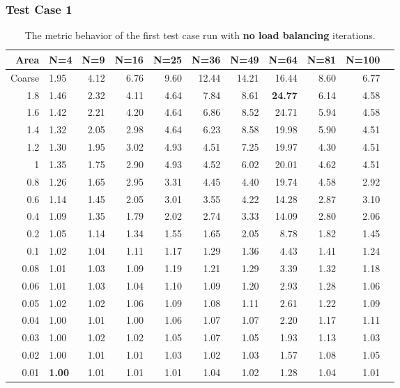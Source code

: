 \documentclass[compress]{beamer}
\begin{document}
\begin{frame}[t]\frametitle{Test Case 1}
\begin{table}[H]
\tiny
\centering
\caption{The metric behavior of the first test case run with \textbf{no load balancing} iterations.}
\begin{tabular}{rlrrrrrrrrr}
  \hline
 Area & N=4 & N=9 & N=16 & N=25 & N=36 & N=49 & N=64 & N=81 & N=100 \\ 
  \hline
 Coarse & 1.95 & 4.12 & 6.76 & 9.60 & 12.44 & 14.21 & 16.44 & 8.60 & 6.77 \\ 
   1.8 & 1.46 & 2.32 & 4.11 & 4.64 & 7.84 & 8.61 & \textbf{\cellcolor{blue!25}24.77} & 6.14 & 4.58 \\ 
 1.6 & 1.42 & 2.21 & 4.20 & 4.64 & 6.86 & 8.52 & 24.71 & 5.94 & 4.58 \\ 
 1.4 & 1.32 & 2.05 & 2.98 & 4.64 & 6.23 & 8.58 & 19.98 & 5.90 & 4.51 \\ 
 1.2 & 1.30 & 1.95 & 3.02 & 4.93 & 4.51 & 7.25 & 19.97 & 4.30 & 4.51 \\ 
  1 & 1.35 & 1.75 & 2.90 & 4.93 & 4.52 & 6.02 & 20.01 & 4.62 & 4.51 \\ 
  0.8 & 1.26 & 1.65 & 2.95 & 3.31 & 4.45 & 4.40 & 19.74 & 4.58 & 2.92 \\ 
   0.6 & 1.14 & 1.45 & 2.05 & 3.01 & 3.55 & 4.22 & 14.28 & 2.87 & 3.10 \\ 
 0.4 & 1.09 & 1.35 & 1.79 & 2.02 & 2.74 & 3.33 & 14.09 & 2.80 & 2.06 \\ 
   0.2 & 1.05 & 1.14 & 1.34 & 1.55 & 1.65 & 2.05 & 8.78 & 1.82 & 1.45 \\ 
  0.1 & 1.02 & 1.04 & 1.11 & 1.17 & 1.29 & 1.36 & 4.43 & 1.41 & 1.24 \\ 
  0.08 & 1.01 & 1.03 & 1.09 & 1.19 & 1.21 & 1.29 & 3.39 & 1.32 & 1.18 \\ 
 0.06 & 1.01 & 1.03 & 1.04 & 1.10 & 1.09 & 1.20 & 2.93 & 1.28 & 1.06 \\ 
  0.05 & 1.02 & 1.02 & 1.06 & 1.09 & 1.08 & 1.11 & 2.61 & 1.22 & 1.09 \\ 
   0.04 & 1.00 & 1.01 & 1.00 & 1.06 & 1.07 & 1.07 & 2.20 & 1.17 & 1.11 \\ 
  0.03 & 1.00 & 1.02 & 1.02 & 1.05 & 1.07 & 1.05 & 1.93 & 1.13 & 1.03 \\ 
   0.02 & 1.00 & 1.01 & 1.01 & 1.03 & 1.02 & 1.03 & 1.57 & 1.08 & 1.05 \\ 
  0.01 & \textbf{\cellcolor{blue!25}1.00} & 1.01 & 1.01 & 1.01 & 1.04 & 1.02 & 1.28 & 1.04 & 1.01 \\ 
   \hline
\end{tabular}
\end{table}
\end{frame}
\end{document}
